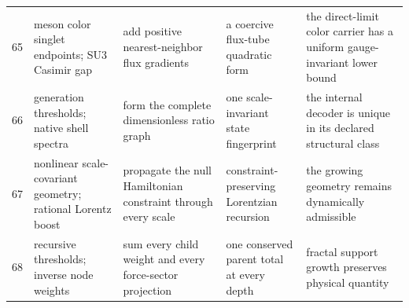 \documentclass[11pt]{article}
\numberwithin{equation}{section}
\theoremstyle{remark}
\begin{document}
\begin{landscape}
\begin{longtable}{p{0.65cm}p{3.5cm}p{4.0cm}p{4.0cm}p{4.6cm}}
65&meson color singlet endpoints; SU3 Casimir gap&add positive nearest-neighbor flux gradients&a coercive flux-tube quadratic form&the direct-limit color carrier has a uniform gauge-invariant lower bound\\
66&generation thresholds; native shell spectra&form the complete dimensionless ratio graph&one scale-invariant state fingerprint&the internal decoder is unique in its declared structural class\\
67&nonlinear scale-covariant geometry; rational Lorentz boost&propagate the null Hamiltonian constraint through every scale&constraint-preserving Lorentzian recursion&the growing geometry remains dynamically admissible\\
68&recursive thresholds; inverse node weights&sum every child weight and every force-sector projection&one conserved parent total at every depth&fractal support growth preserves physical quantity\\
\bottomrule\end{longtable}

\end{landscape}
\end{document}
